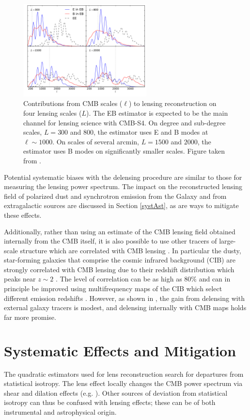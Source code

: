 \begin{figure}[htbp]
\centering
\includegraphics[width=0.60\textwidth]{CMBLensing/signal_contribs.pdf}
\caption{Contributions from CMB scales ($\ell$) to lensing reconstruction on four lensing scales ($L$).  The EB estimator is expected to be the main channel for lensing science with CMB-S4.  On degree and sub-degree scales, $L = 300$ and $800$, the estimator uses E and B modes at $\ell \sim 1000$.  On scales of several arcmin, $L = 1500$ and $2000$, the estimator uses B modes on significantly smaller scales.  Figure taken from \cite{Pearson:2014qna}.}
\label{sigCon}
\end{figure}

Potential systematic biases with the delensing procedure are similar to those for measuring the lensing power spectrum. The impact on the reconstructed lensing field of polarized dust and synchrotron emission from the Galaxy and from extragalactic sources are discussed in Section \ref{systAst}, as are ways to mitigate these effects.

Additionally, rather than using an estimate of the CMB lensing field obtained internally from the CMB itself, it is also possible to use other tracers of large-scale structure which are correlated with  CMB lensing \cite{Smith:2010gu}.  In particular the dusty, star-forming galaxies that comprise the cosmic infrared background (CIB) are strongly correlated with CMB lensing due to their redshift distribution which peaks near $z \sim 2$ \cite{Sherwin:2015baa, Simard:2014aqa}.  The level of correlation can be as high as $80\%$ \cite{Ade:2013aro} and can in principle be improved using multifrequency maps of the CIB which select different emission redshifts \cite{Sherwin:2015baa}. However, as shown in \cite{Smith:2010gu}, the gain from delensing with external galaxy tracers is modest, and delensing internally with CMB maps holds far more promise.


\section{Systematic Effects and Mitigation}\label{syst}
The quadratic estimators used for lens reconstruction search for departures from statistical isotropy.  The lens effect locally changes the CMB power spectrum via shear and dilation effects (e.g. \cite{Bucher:2010iv}).  Other sources of deviation from statistical isotropy can thus be confused with lensing effects; these can be of both instrumental and astrophysical origin.

